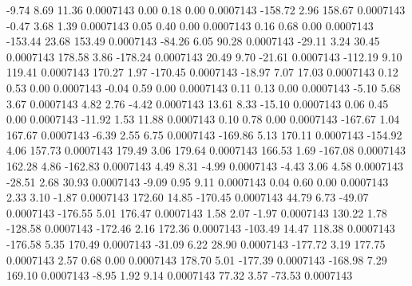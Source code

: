        -9.74        8.69       11.36     0.0007143
        0.00        0.18        0.00     0.0007143
     -158.72        2.96      158.67     0.0007143
       -0.47        3.68        1.39     0.0007143
        0.05        0.40        0.00     0.0007143
        0.16        0.68        0.00     0.0007143
     -153.44       23.68      153.49     0.0007143
      -84.26        6.05       90.28     0.0007143
      -29.11        3.24       30.45     0.0007143
      178.58        3.86     -178.24     0.0007143
       20.49        9.70      -21.61     0.0007143
     -112.19        9.10      119.41     0.0007143
      170.27        1.97     -170.45     0.0007143
      -18.97        7.07       17.03     0.0007143
        0.12        0.53        0.00     0.0007143
       -0.04        0.59        0.00     0.0007143
        0.11        0.13        0.00     0.0007143
       -5.10        5.68        3.67     0.0007143
        4.82        2.76       -4.42     0.0007143
       13.61        8.33      -15.10     0.0007143
        0.06        0.45        0.00     0.0007143
      -11.92        1.53       11.88     0.0007143
        0.10        0.78        0.00     0.0007143
     -167.67        1.04      167.67     0.0007143
       -6.39        2.55        6.75     0.0007143
     -169.86        5.13      170.11     0.0007143
     -154.92        4.06      157.73     0.0007143
      179.49        3.06      179.64     0.0007143
      166.53        1.69     -167.08     0.0007143
      162.28        4.86     -162.83     0.0007143
        4.49        8.31       -4.99     0.0007143
       -4.43        3.06        4.58     0.0007143
      -28.51        2.68       30.93     0.0007143
       -9.09        0.95        9.11     0.0007143
        0.04        0.60        0.00     0.0007143
        2.33        3.10       -1.87     0.0007143
      172.60       14.85     -170.45     0.0007143
       44.79        6.73      -49.07     0.0007143
     -176.55        5.01      176.47     0.0007143
        1.58        2.07       -1.97     0.0007143
      130.22        1.78     -128.58     0.0007143
     -172.46        2.16      172.36     0.0007143
     -103.49       14.47      118.38     0.0007143
     -176.58        5.35      170.49     0.0007143
      -31.09        6.22       28.90     0.0007143
     -177.72        3.19      177.75     0.0007143
        2.57        0.68        0.00     0.0007143
      178.70        5.01     -177.39     0.0007143
     -168.98        7.29      169.10     0.0007143
       -8.95        1.92        9.14     0.0007143
       77.32        3.57      -73.53     0.0007143
